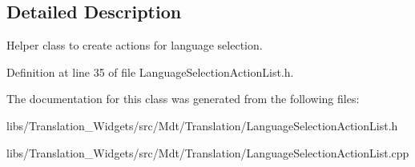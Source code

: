 \subsection{Detailed Description}
Helper class to create actions for language selection. 

Definition at line 35 of file Language\+Selection\+Action\+List.\+h.



The documentation for this class was generated from the following files\+:\begin{DoxyCompactItemize}
\item 
libs/\+Translation\+\_\+\+Widgets/src/\+Mdt/\+Translation/Language\+Selection\+Action\+List.\+h\item 
libs/\+Translation\+\_\+\+Widgets/src/\+Mdt/\+Translation/Language\+Selection\+Action\+List.\+cpp\end{DoxyCompactItemize}
